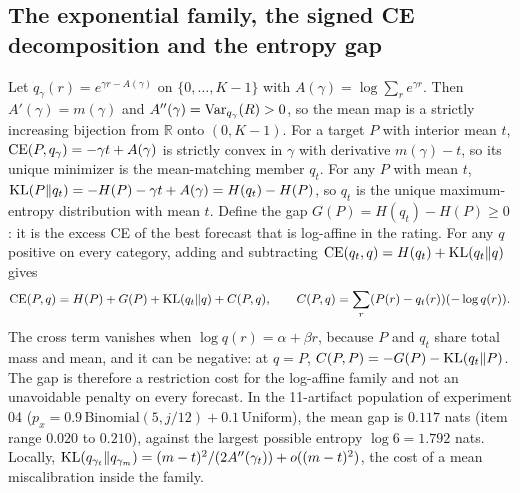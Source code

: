 \subsection{The exponential family, the signed CE decomposition and the entropy gap}
\label{app:ce-gap}
Let $q_\gamma(r)=e^{\gamma r-A(\gamma)}$ on $\{0,\dots,K-1\}$ with $A(\gamma)=\log\sum_re^{\gamma r}$.
Then $A'(\gamma)=m(\gamma)$ and $A''(\gamma)=\operatorname{Var}_{q_\gamma}(R)>0$, so the mean map is a strictly increasing bijection from $\mathbb R$ onto $(0,K-1)$.
For a target $P$ with interior mean $t$, $\mathrm{CE}(P,q_\gamma)=-\gamma t+A(\gamma)$ is strictly convex in $\gamma$ with derivative $m(\gamma)-t$, so its unique minimizer is the mean-matching member $q_t$.
For any $P$ with mean $t$, $\mathrm{KL}(P\|q_t)=-H(P)-\gamma t+A(\gamma)=H(q_t)-H(P)$, so $q_t$ is the unique maximum-entropy distribution with mean $t$.
Define the gap $G(P)=H(q_t)-H(P)\ge0$: it is the excess CE of the best forecast that is log-affine in the rating.
For any $q$ positive on every category, adding and subtracting $\mathrm{CE}(q_t,q)=H(q_t)+\mathrm{KL}(q_t\|q)$ gives
\[
\mathrm{CE}(P,q)=H(P)+G(P)+\mathrm{KL}(q_t\|q)+C(P,q),\qquad C(P,q)=\sum_r(P(r)-q_t(r))(-\log q(r)).
\]
The cross term vanishes when $\log q(r)=\alpha+\beta r$, because $P$ and $q_t$ share total mass and mean, and it can be negative: at $q=P$, $C(P,P)=-G(P)-\mathrm{KL}(q_t\|P)$.
The gap is therefore a restriction cost for the log-affine family and not an unavoidable penalty on every forecast.
In the 11-artifact population of experiment 04 ($p_x=0.9\,\mathrm{Binomial}(5,j/12)+0.1\,\mathrm{Uniform}$), the mean gap is $0.117$ nats (item range $0.020$ to $0.210$), against the largest possible entropy $\log6=1.792$ nats.
Locally, $\mathrm{KL}(q_{\gamma_t}\|q_{\gamma_m})=(m-t)^2/(2A''(\gamma_t))+o((m-t)^2)$, the cost of a mean miscalibration inside the family.

